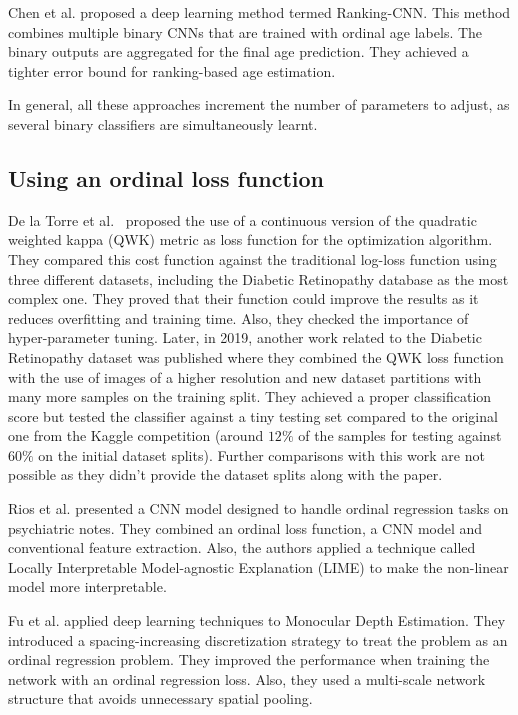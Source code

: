 \documentclass[preprint]{elsarticle}
\begin{document}
Chen et al. \cite{chen2017using} proposed a deep learning method termed Ranking-CNN. This method combines multiple binary CNNs that are trained with ordinal age labels. The binary outputs are aggregated for the final age prediction. They achieved a tighter error bound for ranking-based age estimation.

In general, all these approaches increment the number of parameters to adjust, as several binary classifiers are simultaneously learnt.


\subsection{Using an ordinal loss function}

De la Torre et al.~\cite{de2018weighted} proposed the use of a continuous version of the quadratic weighted kappa (QWK) metric as loss function for the optimization algorithm. They compared this cost function against the traditional log-loss function using three different datasets, including the Diabetic Retinopathy database as the most complex one. They proved that their function could improve the results as it reduces overfitting and training time. Also, they checked the importance of hyper-parameter tuning. Later, in 2019, another work related to the Diabetic Retinopathy dataset was published \cite{de2019deep} where they combined the QWK loss function with the use of images of a higher resolution and new dataset partitions with many more samples on the training split. They achieved a proper classification score but tested the classifier against a tiny testing set compared to the original one from the Kaggle competition (around $12\%$ of the samples for testing against $60\%$ on the initial dataset splits). Further comparisons with this work are not possible as they didn't provide the dataset splits along with the paper.

Rios et al. \cite{rios2017ordinal} presented a CNN model designed to handle ordinal regression tasks on psychiatric notes. They combined an ordinal loss function, a CNN model and conventional feature extraction. Also, the authors applied a technique called Locally Interpretable Model-agnostic Explanation (LIME) to make the non-linear model more interpretable.

Fu et al. \cite{fu2018deep} applied deep learning techniques to Monocular Depth Estimation. They introduced a spacing-increasing discretization strategy to treat the problem as an ordinal regression problem. They improved the performance when training the network with an ordinal regression loss. Also, they used a multi-scale network structure that avoids unnecessary spatial pooling.
\end{document}
